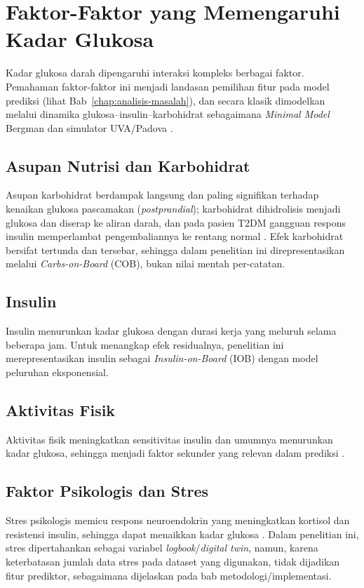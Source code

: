 \section{Faktor-Faktor yang Memengaruhi Kadar Glukosa}
Kadar glukosa darah dipengaruhi interaksi kompleks berbagai faktor. Pemahaman faktor-faktor ini menjadi landasan pemilihan fitur pada model prediksi (lihat Bab~\ref{chap:analisis-masalah}), dan secara klasik dimodelkan melalui dinamika glukosa--insulin--karbohidrat sebagaimana \emph{Minimal Model} Bergman dan simulator UVA/Padova \autocite{bergman1979,dallaman2014}.

\subsection{Asupan Nutrisi dan Karbohidrat}
Asupan karbohidrat berdampak langsung dan paling signifikan terhadap kenaikan glukosa pascamakan (\emph{postprandial}); karbohidrat dihidrolisis menjadi glukosa dan diserap ke aliran darah, dan pada pasien T2DM gangguan respons insulin memperlambat pengembaliannya ke rentang normal \autocite{ada2023}. Efek karbohidrat bersifat tertunda dan tersebar, sehingga dalam penelitian ini direpresentasikan melalui \emph{Carbs-on-Board} (COB), bukan nilai mentah per-catatan.

\subsection{Insulin}
Insulin menurunkan kadar glukosa dengan durasi kerja yang meluruh selama beberapa jam. Untuk menangkap efek residualnya, penelitian ini merepresentasikan insulin sebagai \emph{Insulin-on-Board} (IOB) dengan model peluruhan eksponensial.

\subsection{Aktivitas Fisik}
Aktivitas fisik meningkatkan sensitivitas insulin dan umumnya menurunkan kadar glukosa, sehingga menjadi faktor sekunder yang relevan dalam prediksi \autocite{colberg2016}.

\subsection{Faktor Psikologis dan Stres}
Stres psikologis memicu respons neuroendokrin yang meningkatkan kortisol dan resistensi insulin, sehingga dapat menaikkan kadar glukosa \autocite{hackett2017}. Dalam penelitian ini, stres dipertahankan sebagai variabel \emph{logbook}/\emph{digital twin}, namun, karena keterbatasan jumlah data stres pada dataset yang digunakan, tidak dijadikan fitur prediktor, sebagaimana dijelaskan pada bab metodologi/implementasi.


